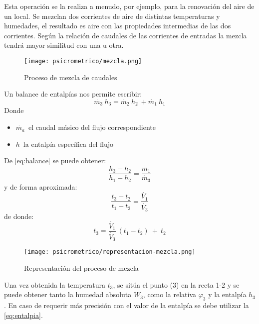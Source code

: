         Esta operaci\'on se la realiza a menudo, por ejemplo, para la renovaci\'on del aire de un local. Se mezclan dos corrientes de aire de distintas temperaturas y humedades, el resultado es aire con las propiedades intermedias de las dos corrientes. Seg\'un la relaci\'on de caudales de las corrientes de entradas la mezcla tendr\'a mayor similitud con una u otra.
         \begin{figure}[H]
             \centering
             \texttt{[image: psicrometrico/mezcla.png]}
             \caption{Proceso de mezcla de caudales}
             \label{fig:mezcla}
         \end{figure}
        Un balance de entalp\'ias nos permite escribir:
        \begin{equation}
            \dot{m_3}\ h_3 = \dot{m_2}\ h_2\ + \dot{m_1}\ h_1
            \label{eq:balance}
        \end{equation}
        Donde
        \begin{itemize}
            \item $\dot{m_a}$\ el caudal m\'asico del flujo correspondiente
            \item $h$\ la entalp\'ia espec\'ifica del flujo
        \end{itemize}
        De \autoref{eq:balance} se puede obtener:
        \begin{equation*}
            \frac{h_3 - h_2}{h_1-h_2}=\frac{\dot{m_1}}{\dot{m_3}}
        \end{equation*}
        y de forma aproximada:
        \begin{equation*}
            \frac{t_3-t_2}{t_1-t_2}=\frac{\dot{V_1}}{\dot{V_3}}
        \end{equation*}
        de donde:
        \begin{equation}
            t_3=\frac{\dot{V_1}}{\dot{V_3}}\ (t_1-t_2)\ +\ t_2
            \label{eq:temperatura-mezcla}
        \end{equation}
         \begin{figure}[H]
             \centering
             \texttt{[image: psicrometrico/representacion-mezcla.png]}
             \caption{Representaci\'on del proceso de mezcla}
             \label{fig:representacion-mezcla}
         \end{figure}
        Una vez obtenida la temperatura $t_3$, se sit\'ua el punto (3) en la recta 1-2 y se puede obtener tanto la humedad absoluta $W_3$, como la relativa $\varphi_3$ y la entalp\'ia $h_3$. En caso de requerir m\'as precisi\'on con el valor de la entalp\'ia se debe utilizar la \autoref{eq:entalpia}.
        
